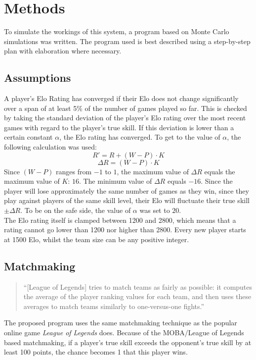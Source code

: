 \documentclass[12pt]{article}
\begin{document}
\section{Methods}
To simulate the workings of this system, a program based on Monte Carlo simulations\cite{montecarlo} was written. The program used is best described using a step-by-step plan with elaboration where necessary.
\subsection{Assumptions}
A player’s Elo Rating has converged if their Elo does not change significantly over a span of at least 5\% of the number of games played so far. This is checked by taking the standard deviation of the player's Elo rating over the most recent games with regard to the player’s true skill. If this deviation is lower than a certain constant $\alpha$, the Elo rating has converged. To get to the value of $\alpha$, the following calculation was used:
\[R' = R + (W - P) \cdot K\]
\[\Delta R = (W - P) \cdot K\]
Since $(W - P)$ ranges from $-1$ to $1$, the maximum value of $\Delta R$ equals the maximum value of $K$: $16$. The minimum value of $\Delta R$ equals $-16$. Since the player will lose approximately the same number of games as they win, since they play against players of the same skill level, their Elo will fluctuate their true skill $\pm \Delta R$. To be on the safe side, the value of $\alpha$ was set to $20$.\\
The Elo rating itself is clamped between 1200 and 2800, which means that a rating cannot go lower than 1200 nor higher than 2800. Every new player starts at 1500 Elo, whilst the team size can be any positive integer.

\subsection{Matchmaking}
\begin{quote}
``[League of Legends] tries to match teams as fairly as possible: it computes the average of the player ranking values for each team, and then uses these averages to match teams similarly to one-versus-one fights.''\cite{moba}
\end{quote}
The proposed program uses the same matchmaking technique as the popular online game \textit{League of Legends} does. Because of the MOBA/League of Legends based matchmaking, if a player's true skill exceeds the opponent's true skill by at least 100 points, the chance becomes 1 that this player wins.
\end{document}
